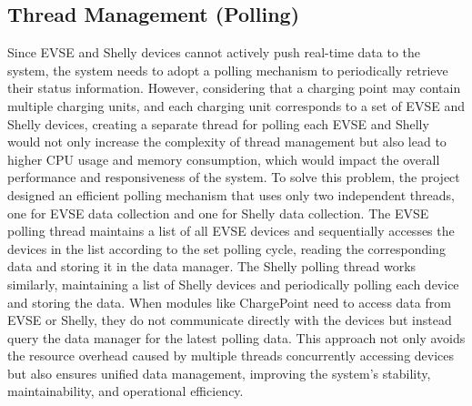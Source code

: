 \documentclass[
english,
ruledheaders=section,%
class=report,%
thesis={type=Report},%
accentcolor=9c,%
custommargins=true,%
marginpar=false,%
parskip=half-,%
fontsize=11pt,%
logofile={img/tuda_logo.pdf}, %
]{tudapub}
\begin{document}

    \subsection{Thread Management (Polling)}
    Since EVSE and Shelly devices cannot actively push real-time data to the system, the system needs to adopt a polling mechanism to periodically retrieve their status information. However, considering that a charging point may contain multiple charging units, and each charging unit corresponds to a set of EVSE and Shelly devices, creating a separate thread for polling each EVSE and Shelly would not only increase the complexity of thread management but also lead to higher CPU usage and memory consumption, which would impact the overall performance and responsiveness of the system. To solve this problem, the project designed an efficient polling mechanism that uses only two independent threads, one for EVSE data collection and one for Shelly data collection. The EVSE polling thread maintains a list of all EVSE devices and sequentially accesses the devices in the list according to the set polling cycle, reading the corresponding data and storing it in the data manager. The Shelly polling thread works similarly, maintaining a list of Shelly devices and periodically polling each device and storing the data. When modules like ChargePoint need to access data from EVSE or Shelly, they do not communicate directly with the devices but instead query the data manager for the latest polling data. This approach not only avoids the resource overhead caused by multiple threads concurrently accessing devices but also ensures unified data management, improving the system's stability, maintainability, and operational efficiency.
\end{document}
